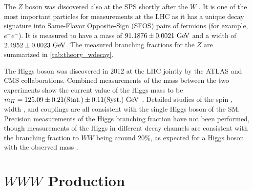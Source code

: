 The $Z$ boson was discovered also at the SPS shortly after the 
$W$ \cite{ua1zobs}.
It is one of the most important particles for measurements at the LHC
as it has a unique decay signature into Same-Flavor Opposite-Sign (SFOS) 
pairs of fermions (for example, $e^+ e^-$).
It is measured to have
a mass of $91.1876 \pm 0.0021 \GeV$ and a width of $2.4952 \pm 0.0023 \GeV$.
The measured branching fractions for the $Z$ are 
summarized in \tab\ref{tab:theory_wdecay}.


The Higgs boson was discovered in 2012 at the LHC
jointly by the ATLAS \cite{Aad20121} and CMS \cite{Chatrchyan:2012xdj}
collaborations.
Combined measurements of the mass between the two experiments 
show the current value of the Higgs mass to be 
$m_H = 125.09\pm0.21(\textrm{Stat.})\pm0.11(\textrm{Syst.})\GeV$
\cite{Aad:2015zhl}. %
Detailed studies of the spin \cite{Aad2013120,Khachatryan:2014kca},
width \cite{Aad:2015xua,Khachatryan:2014iha},
and couplings \cite{ATLAS-CONF-2015-044} are all consistent
with the single Higgs boson of the SM.
Precision measurements of the Higgs branching fraction have not 
been performed, though measurements of the Higgs in 
different decay channels are consistent with 
the branching fraction to $WW$ being around 20\%, as expected
for a Higgs boson with the observed mass \cite{PDG:2014,Almeida:2013jfa}.


\section{$WWW$ Production}
\label{sec:theory_www_production}

